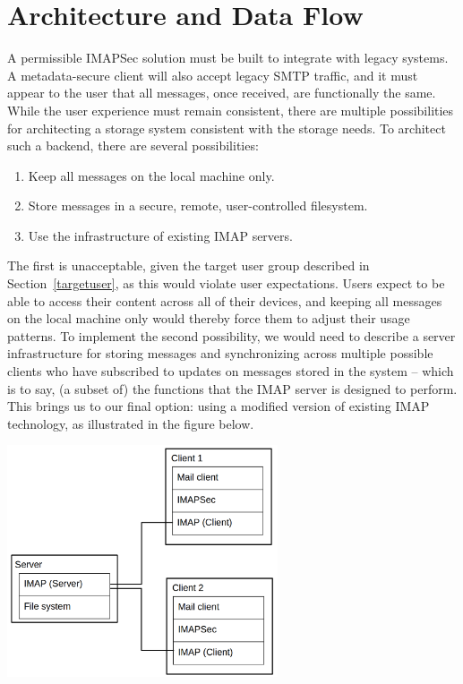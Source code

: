 \documentclass[pageno]{jpaper}
\newcommand{\project}{IMAPSec }
\begin{document}
\section{Architecture and Data Flow}
\label{architecture}


A permissible \project solution must be built to integrate with legacy systems. A metadata-secure client will also accept legacy SMTP traffic, and it must appear to the user that all messages, once received, are functionally the same. While the user experience must remain consistent, there are multiple possibilities for architecting a storage system consistent with the storage needs. To architect such a backend, there are several possibilities:

\begin{enumerate}
  \item Keep all messages on the local machine only.
    \item Store messages in a secure, remote, user-controlled filesystem.
    \item Use the infrastructure of existing IMAP servers.
\end{enumerate}

The first is unacceptable, given the target user group described in Section~\ref{targetuser}, as this would violate user expectations. Users expect to be able to access their content across all of their devices, and keeping all messages on the local machine only would thereby force them to adjust their usage patterns. To implement the second possibility, we would need to describe a server infrastructure for storing messages and synchronizing across multiple possible clients who have subscribed to updates on messages stored in the system -- which is to say, (a subset of) the functions that the IMAP server is designed to perform. This brings us to our final option: using a modified version of existing IMAP technology, as illustrated in the figure below.

\begin{center}

\includegraphics[width=0.6\textwidth]{server_client_boxes}

\end{center}
\end{document}
